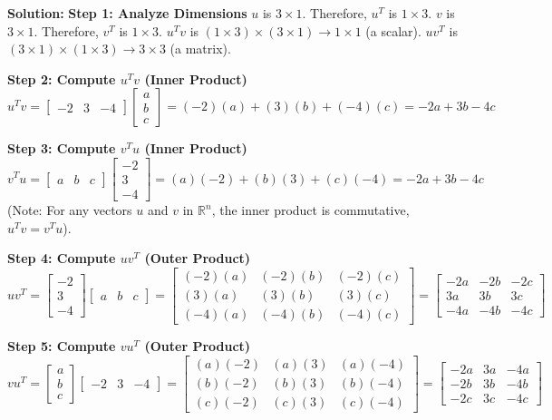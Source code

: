\documentclass{article}
\begin{document}
\textbf{Solution:}
\textbf{Step 1: Analyze Dimensions}
$u$ is $3 \times 1$. Therefore, $u^T$ is $1 \times 3$.
$v$ is $3 \times 1$. Therefore, $v^T$ is $1 \times 3$.
$u^T v$ is $(1 \times 3) \times (3 \times 1) \rightarrow 1 \times 1$ (a scalar).
$uv^T$ is $(3 \times 1) \times (1 \times 3) \rightarrow 3 \times 3$ (a matrix).

\textbf{Step 2: Compute $u^T v$ (Inner Product)}
\[ u^T v = \begin{bmatrix} -2 & 3 & -4 \end{bmatrix} \begin{bmatrix} a \\ b \\ c \end{bmatrix} = (-2)(a) + (3)(b) + (-4)(c) = -2a + 3b - 4c \]

\textbf{Step 3: Compute $v^T u$ (Inner Product)}
\[ v^T u = \begin{bmatrix} a & b & c \end{bmatrix} \begin{bmatrix} -2 \\ 3 \\ -4 \end{bmatrix} = (a)(-2) + (b)(3) + (c)(-4) = -2a + 3b - 4c \]
(Note: For any vectors $u$ and $v$ in $\mathbb{R}^n$, the inner product is commutative, $u^T v = v^T u$).

\textbf{Step 4: Compute $uv^T$ (Outer Product)}
\[ uv^T = \begin{bmatrix} -2 \\ 3 \\ -4 \end{bmatrix} \begin{bmatrix} a & b & c \end{bmatrix} = \begin{bmatrix} (-2)(a) & (-2)(b) & (-2)(c) \\ (3)(a) & (3)(b) & (3)(c) \\ (-4)(a) & (-4)(b) & (-4)(c) \end{bmatrix} = \begin{bmatrix} -2a & -2b & -2c \\ 3a & 3b & 3c \\ -4a & -4b & -4c \end{bmatrix} \]

\textbf{Step 5: Compute $vu^T$ (Outer Product)}
\[ vu^T = \begin{bmatrix} a \\ b \\ c \end{bmatrix} \begin{bmatrix} -2 & 3 & -4 \end{bmatrix} = \begin{bmatrix} (a)(-2) & (a)(3) & (a)(-4) \\ (b)(-2) & (b)(3) & (b)(-4) \\ (c)(-2) & (c)(3) & (c)(-4) \end{bmatrix} = \begin{bmatrix} -2a & 3a & -4a \\ -2b & 3b & -4b \\ -2c & 3c & -4c \end{bmatrix} \]
\end{document}

